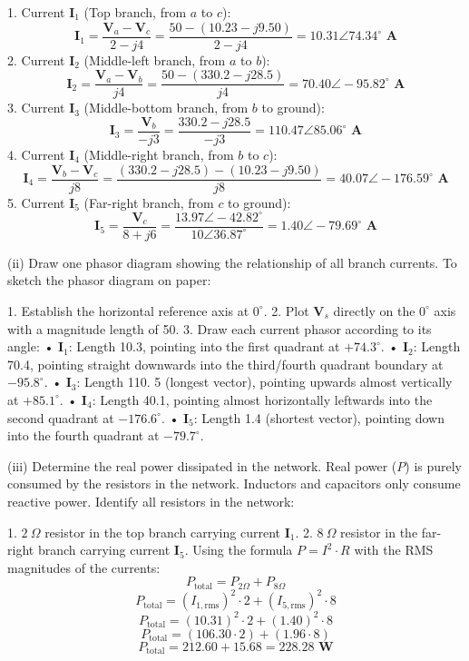 1. Current $\mathbf{I}_1$ (Top branch, from $a$ to $c$):
$$\mathbf{I}_1 = \frac{\mathbf{V}_a - \mathbf{V}_c}{2 - j4} = \frac{50 - (10.23 - j9.50)}{2 - j4} = \mathbf{10.31 \angle 74.34^\circ\text{ A}}$$ 
2. Current $\mathbf{I}_2$ (Middle-left branch, from $a$ to $b$):
$$\mathbf{I}_2 = \frac{\mathbf{V}_a - \mathbf{V}_b}{j4} = \frac{50 - (330.2 - j28.5)}{j4} = \mathbf{70.40 \angle -95.82^\circ\text{ A}}$$ 
3. Current $\mathbf{I}_3$ (Middle-bottom branch, from $b$ to ground):
$$\mathbf{I}_3 = \frac{\mathbf{V}_b}{-j3} = \frac{330.2 - j28.5}{-j3} = \mathbf{110.47 \angle 85.06^\circ\text{ A}}$$ 
4. Current $\mathbf{I}_4$ (Middle-right branch, from $b$ to $c$):
$$\mathbf{I}_4 = \frac{\mathbf{V}_b - \mathbf{V}_c}{j8} = \frac{(330.2 - j28.5) - (10.23 - j9.50)}{j8} = \mathbf{40.07 \angle -176.59^\circ\text{ A}}$$ 
5. Current $\mathbf{I}_5$ (Far-right branch, from $c$ to ground):
$$\mathbf{I}_5 = \frac{\mathbf{V}_c}{8 + j6} = \frac{13.97 \angle -42.82^\circ}{10 \angle 36.87^\circ} = \mathbf{1.40 \angle -79.69^\circ\text{ A}}$$ 

(ii) Draw one phasor diagram showing the relationship of all branch currents.
To sketch the phasor diagram on paper:

1. Establish the horizontal reference axis at $0^\circ$.
2. Plot $\mathbf{V}_s$ directly on the $0^\circ$ axis with a magnitude length of 50.
3. Draw each current phasor according to its angle:
 • $\mathbf{I}_1$: Length 10.3, pointing into the first quadrant at $+74.3^\circ$.
 • $\mathbf{I}_2$: Length 70.4, pointing straight downwards into the third/fourth quadrant boundary at $-95.8^\circ$.
 • $\mathbf{I}_3$: Length 110.
5 (longest vector), pointing upwards almost vertically at $+85.1^\circ$.
 • $\mathbf{I}_4$: Length 40.1, pointing almost horizontally leftwards into the second quadrant at $-176.6^\circ$.
 • $\mathbf{I}_5$: Length 1.4 (shortest vector), pointing down into the fourth quadrant at $-79.7^\circ$.


(iii) Determine the real power dissipated in the network.
Real power ($P$) is purely consumed by the resistors in the network. Inductors and capacitors only consume reactive power.
Identify all resistors in the network:

1. $2\ \Omega$ resistor in the top branch carrying current $\mathbf{I}_1$.
2. $8\ \Omega$ resistor in the far-right branch carrying current $\mathbf{I}_5$.
Using the formula $P = I^2 \cdot R$ with the RMS magnitudes of the currents:
$$P_{\text{total}} = P_{2\Omega} + P_{8\Omega}$$ 
$$P_{\text{total}} = (I_{1,\text{rms}})^2 \cdot 2 + (I_{5,\text{rms}})^2 \cdot 8$$ 
$$P_{\text{total}} = (10.31)^2 \cdot 2 + (1.40)^2 \cdot 8$$ 
$$P_{\text{total}} = (106.30 \cdot 2) + (1.96 \cdot 8)$$ 
$$P_{\text{total}} = 212.60 + 15.68 = \mathbf{228.28\text{ W}}$$ 


